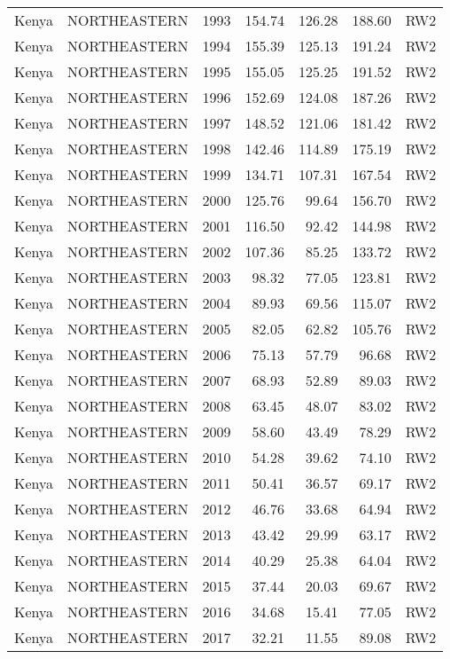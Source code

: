 \begin{longtable}{lllrrrl}
  Kenya & NORTHEASTERN & 1993 & 154.74 & 126.28 & 188.60 & RW2 \\ 
  Kenya & NORTHEASTERN & 1994 & 155.39 & 125.13 & 191.24 & RW2 \\ 
  Kenya & NORTHEASTERN & 1995 & 155.05 & 125.25 & 191.52 & RW2 \\ 
  Kenya & NORTHEASTERN & 1996 & 152.69 & 124.08 & 187.26 & RW2 \\ 
  Kenya & NORTHEASTERN & 1997 & 148.52 & 121.06 & 181.42 & RW2 \\ 
  Kenya & NORTHEASTERN & 1998 & 142.46 & 114.89 & 175.19 & RW2 \\ 
  Kenya & NORTHEASTERN & 1999 & 134.71 & 107.31 & 167.54 & RW2 \\ 
  Kenya & NORTHEASTERN & 2000 & 125.76 & 99.64 & 156.70 & RW2 \\ 
  Kenya & NORTHEASTERN & 2001 & 116.50 & 92.42 & 144.98 & RW2 \\ 
  Kenya & NORTHEASTERN & 2002 & 107.36 & 85.25 & 133.72 & RW2 \\ 
  Kenya & NORTHEASTERN & 2003 & 98.32 & 77.05 & 123.81 & RW2 \\ 
  Kenya & NORTHEASTERN & 2004 & 89.93 & 69.56 & 115.07 & RW2 \\ 
  Kenya & NORTHEASTERN & 2005 & 82.05 & 62.82 & 105.76 & RW2 \\ 
  Kenya & NORTHEASTERN & 2006 & 75.13 & 57.79 & 96.68 & RW2 \\ 
  Kenya & NORTHEASTERN & 2007 & 68.93 & 52.89 & 89.03 & RW2 \\ 
  Kenya & NORTHEASTERN & 2008 & 63.45 & 48.07 & 83.02 & RW2 \\ 
  Kenya & NORTHEASTERN & 2009 & 58.60 & 43.49 & 78.29 & RW2 \\ 
  Kenya & NORTHEASTERN & 2010 & 54.28 & 39.62 & 74.10 & RW2 \\ 
  Kenya & NORTHEASTERN & 2011 & 50.41 & 36.57 & 69.17 & RW2 \\ 
  Kenya & NORTHEASTERN & 2012 & 46.76 & 33.68 & 64.94 & RW2 \\ 
  Kenya & NORTHEASTERN & 2013 & 43.42 & 29.99 & 63.17 & RW2 \\ 
  Kenya & NORTHEASTERN & 2014 & 40.29 & 25.38 & 64.04 & RW2 \\ 
  Kenya & NORTHEASTERN & 2015 & 37.44 & 20.03 & 69.67 & RW2 \\ 
  Kenya & NORTHEASTERN & 2016 & 34.68 & 15.41 & 77.05 & RW2 \\ 
  Kenya & NORTHEASTERN & 2017 & 32.21 & 11.55 & 89.08 & RW2 \\ 

\end{longtable}
